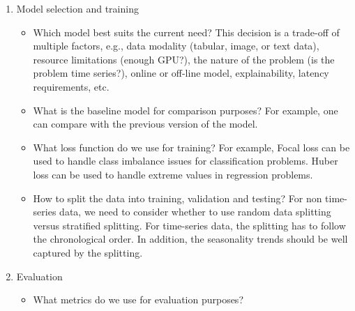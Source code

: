 \begin{enumerate}
    \item Model selection and training
        \begin{itemize}
            \item Which model best suits the current need? This decision is a trade-off of multiple factors, e.g., data modality (tabular, image, or text data), resource limitations (enough GPU?), the nature of the problem (is the problem time series?), online or off-line model, explainability, latency requirements, etc. 
            \item What is the baseline model for comparison purposes? For example, one can compare with the previous version of the model. 
            \item What loss function do we use for training? For example, Focal loss can be used to handle class imbalance issues for classification problems. Huber loss can be used to handle extreme values in regression problems. 
            \item How to split the data into training, validation and testing?  For non time-series data, we need to consider whether to use random data splitting versus stratified splitting. For time-series data, the splitting has to follow the chronological order.  In addition, the seasonality trends should be well captured by the splitting. 
        \end{itemize}


    \item Evaluation 
        \begin{itemize}
            \item What metrics do we use for evaluation purposes?
        \end{itemize}
\end{enumerate}